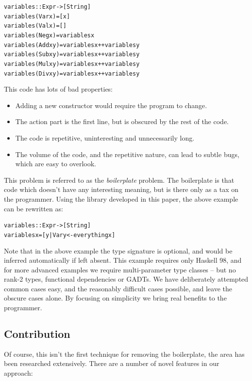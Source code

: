 \documentclass[preprint]{sigplanconf}
\newenvironment{code}{\begin{alltt}\small}{\end{alltt}}
\begin{document}
\begin{code}
variables :: Expr -> [String]
variables (Var  x    ) = [x]
variables (Val  x    ) = []
variables (Neg  x    ) = variables x
variables (Add  x y  ) = variables x ++ variables y
variables (Sub  x y  ) = variables x ++ variables y
variables (Mul  x y  ) = variables x ++ variables y
variables (Div  x y  ) = variables x ++ variables y
\end{code}

This code has lots of bad properties:

\begin{itemize}
\item Adding a new constructor would require the program to change.
\item The action part is the first line, but is obscured by the rest of the code.
\item The code is repetitive, uninteresting and unnecessarily long.
\item The volume of the code, and the repetitive nature, can lead to subtle bugs, which are easy to overlook.
\end{itemize}

This problem is referred to as the \textit{boilerplate} problem. The boilerplate is that code which doesn't have any interesting meaning, but is there only as a tax on the programmer. Using the library developed in this paper, the above example can be rewritten as:

\begin{code}
variables :: Expr -> [String]
variables x = [y | Var y <- everything x]
\end{code}

Note that in the above example the type signature is optional, and would be inferred automatically if left absent. This example requires only Haskell 98, and for more advanced examples we require multi-parameter type classes -- but no rank-2 types, functional dependencies or GADTs. We have deliberately attempted common cases easy, and the reasonably difficult cases possible, and leave the obscure cases alone. By focusing on simplicity we bring real benefits to the programmer.

\subsection{Contribution}

Of course, this isn't the first technique for removing the boilerplate, the area has been researched extensively. There are a number of novel features in our approach:
\end{document}
